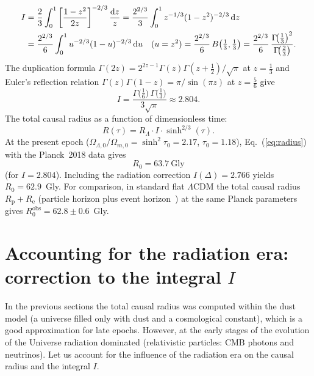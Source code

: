 \documentclass[10pt,a4paper]{article}
\begin{document}
\begin{align}
I &= \frac{2}{3}\int_0^1\left[\frac{1-z^2}{2z}\right]^{-2/3}\frac{\mathrm{d}z}{z}
   = \frac{2^{2/3}}{3}\int_0^1 z^{-1/3}(1-z^2)^{-2/3}\,\mathrm{d}z \notag\\
  &= \frac{2^{2/3}}{6}\int_0^1 u^{-2/3}(1-u)^{-2/3}\,\mathrm{d}u
   \quad (u=z^2)
   = \frac{2^{2/3}}{6}\,B\!\left(\tfrac{1}{3},\tfrac{1}{3}\right)
   = \frac{2^{2/3}}{6}\,\frac{\Gamma\!\bigl(\tfrac{1}{3}\bigr)^2}{\Gamma\!\bigl(\tfrac{2}{3}\bigr)}.
\end{align}
The duplication formula $\Gamma(2z)=2^{2z-1}\Gamma(z)\Gamma(z+\tfrac12)/\sqrt{\pi}$ at $z=\tfrac13$ and Euler's reflection relation $\Gamma(z)\Gamma(1-z)=\pi/\sin(\pi z)$ at $z=\tfrac56$ give
\begin{equation}
\boxed{I = \frac{\Gamma\!\bigl(\tfrac{1}{6}\bigr)\,\Gamma\!\bigl(\tfrac{1}{3}\bigr)}{3\sqrt{\pi}} \approx 2.804.}
\end{equation}
The total causal radius as a function of dimensionless time:
\begin{equation}
\boxed{R(\tau) = R_\Lambda \cdot I \cdot \sinh^{2/3}(\tau).} \label{eq:radius}
\end{equation}
At the present epoch ($\Omega_{\Lambda,0}/\Omega_{m,0}=\sinh^2\tau_0=2.17$, $\tau_0=1.18$), Eq.~(\ref{eq:radius}) with the Planck~2018 data gives
\begin{equation}
\boxed{R_0 = 63.7~\text{Gly}}
\end{equation}
(for $I=2.804$). Including the radiation correction $I(\Delta)=2.766$ yields $R_0=62.9$~Gly. For comparison, in standard flat $\Lambda$CDM the total causal radius $R_{\mathrm{p}}+R_{\mathrm{e}}$ (particle horizon plus event horizon~\cite{Davis2004}) at the same Planck parameters gives $R_0^{\mathrm{obs}}=62.8\pm 0.6$~Gly.

\section{Accounting for the radiation era: correction to the integral \texorpdfstring{$I$}{I}}
\label{sec:radcorr}

In the previous sections the total causal radius was computed within the dust model (a universe filled only with dust and a cosmological constant), which is a good approximation for late epochs. However, at the early stages of the evolution of the Universe radiation dominated (relativistic particles: CMB photons and neutrinos). Let us account for the influence of the radiation era on the causal radius and the integral $I$.
\end{document}
